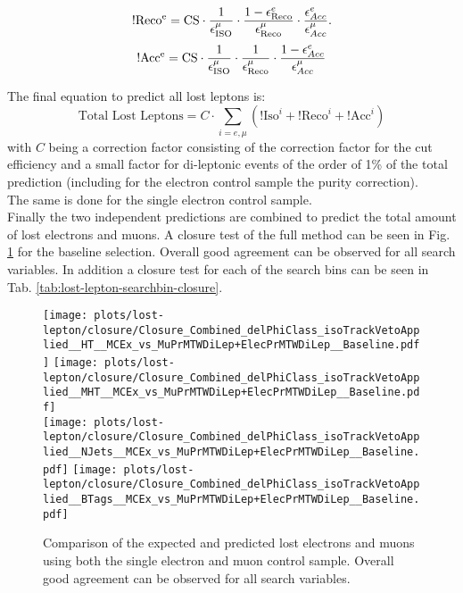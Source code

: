 \begin{equation}
  {\rm !Reco^{e}} = {\rm CS}\cdot \frac{1}{\epsilon_{\rm ISO}^{\mu}}\cdot \frac{1-\epsilon_{\rm Reco}^{e}}{\epsilon_{\rm Reco}^{\mu}}  \cdot \frac{\epsilon^{e}_{Acc}}{\epsilon^{\mu}_{Acc}}.
  \label{eq:elec_reco}
\end{equation}
\begin{equation}
  {\rm !Acc^{e}} = {\rm CS}\cdot \frac{1}{\epsilon_{\rm ISO}^{\mu}}\cdot \frac{1}{\epsilon_{\rm Reco}^{\mu}}  \cdot \frac{1 - \epsilon^{e}_{Acc}}{\epsilon^{\mu}_{Acc}}
  \label{eq:elec_acc}
\end{equation}

The final equation to predict all lost leptons is:
\begin{equation}
  \label{eq:totalWeight}
  \text{Total Lost Leptons} = C \cdot \sum_{i=e,\mu}\left(\text{!Iso}^i+\text{!Reco}^i+\text{!Acc}^i\right) 
\end{equation}
with $C$ being a correction factor consisting of the correction factor for the \mt cut efficiency and a small factor for di-leptonic events of the order of 1\% of the total prediction (including for the electron control sample the purity correction).\\ 
The same is done for the single electron control sample.\\
Finally the two independent predictions are combined to predict the total amount of lost electrons and muons. A closure test of the full method can be seen in Fig. \ref{fig:lost-lepton-closure} for the baseline selection. Overall good agreement can be observed for all search variables. In addition a closure test for each of the search bins can be seen in Tab. \ref{tab:lost-lepton-searchbin-closure}. 

\begin{figure}[h]
  \centering
  \texttt{[image: plots/lost-lepton/closure/Closure\_Combined\_delPhiClass\_isoTrackVetoApplied\_\_HT\_\_MCEx\_vs\_MuPrMTWDiLep+ElecPrMTWDiLep\_\_Baseline.pdf]}
  \texttt{[image: plots/lost-lepton/closure/Closure\_Combined\_delPhiClass\_isoTrackVetoApplied\_\_MHT\_\_MCEx\_vs\_MuPrMTWDiLep+ElecPrMTWDiLep\_\_Baseline.pdf]}\\
  \texttt{[image: plots/lost-lepton/closure/Closure\_Combined\_delPhiClass\_isoTrackVetoApplied\_\_NJets\_\_MCEx\_vs\_MuPrMTWDiLep+ElecPrMTWDiLep\_\_Baseline.pdf]}
  \texttt{[image: plots/lost-lepton/closure/Closure\_Combined\_delPhiClass\_isoTrackVetoApplied\_\_BTags\_\_MCEx\_vs\_MuPrMTWDiLep+ElecPrMTWDiLep\_\_Baseline.pdf]}\\
  \caption{Comparison of the expected and predicted lost electrons and muons using both the single electron and muon control sample. Overall good agreement can be observed for all search variables.}
  \label{fig:lost-lepton-closure}
\end{figure}
\clearpage

